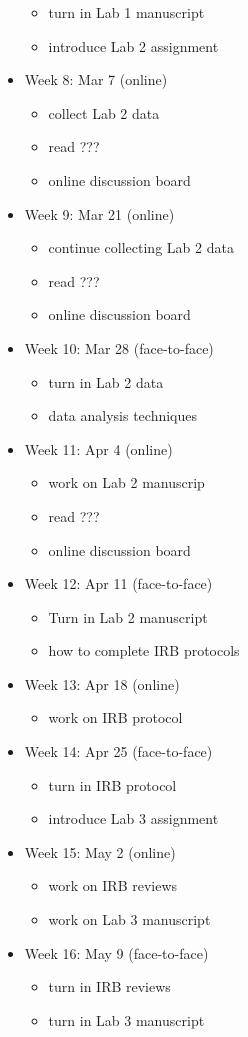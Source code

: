 \documentclass[10pt]{article}
\begin{document}
\begin{itemize}
\begin{itemize}
\item turn in Lab 1 manuscript
\item introduce Lab 2 assignment
\end{itemize}
\item Week 8: Mar 7 (online)
\begin{itemize}
\item collect Lab 2 data
\item read ???
\item online discussion board
\end{itemize}
\item Week 9: Mar 21 (online)
\begin{itemize}
\item continue collecting Lab 2 data
\item read ???
\item online discussion board
\end{itemize}
\item Week 10: Mar 28 (face-to-face)
\begin{itemize}
\item turn in Lab 2 data
\item data analysis techniques
\end{itemize}
\item Week 11: Apr 4 (online)
\begin{itemize}
\item work on Lab 2 manuscrip
\item read ???
\item online discussion board
\end{itemize}
\item Week 12: Apr 11 (face-to-face)
\begin{itemize}
\item Turn in Lab 2 manuscript
\item how to complete IRB protocols
\end{itemize}
\item Week 13: Apr 18 (online)
\begin{itemize}
\item work on IRB protocol
\end{itemize}
\item Week 14: Apr 25 (face-to-face)
\begin{itemize}
\item turn in IRB protocol
\item introduce Lab 3 assignment
\end{itemize}
\item Week 15: May 2 (online)
\begin{itemize}
\item work on IRB reviews
\item work on Lab 3 manuscript
\end{itemize}
\item Week 16: May 9 (face-to-face)
\begin{itemize}
\item turn in IRB reviews
\item turn in Lab 3 manuscript
\end{itemize}
\end{itemize}
\end{document}
